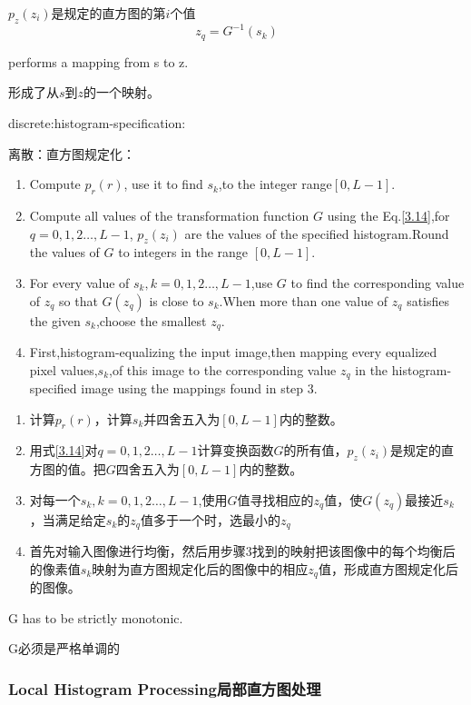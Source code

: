 \documentclass[12pt]{article}
\numberwithin{equation}{section}%
\begin{document}
$p_z(z_{i})$是规定的直方图的第$i$个值
\begin{equation} \label {3.16}
z_{q}=G^{-1}(s_{k})
\end{equation}

performs a mapping from s to z.

形成了从$s$到$z$的一个映射。

discrete:histogram-specification:

离散：直方图规定化：

\begin{enumerate}
\item Compute $p_{r}(r)$, use it to find $s_{k}$,to the integer range$[0,L-1]$.
\item Compute all values of the transformation function $G$ using the Eq.\ref{3.14},for $q=0,1,2\ldots,L-1$, $p_{z}(z_{i})$ are the values of the specified histogram.Round the values of $G$ to integers in the range   $[0,L-1]$.
\item For every value of $s_{k},k=0,1,2\ldots,L-1$,use $G$ to find the corresponding value of $z_{q}$ so that $G(z_{q})$ is close to $s_{k}$.When more than one value of $z_{q}$ satisfies the given $s_{k}$,choose  the smallest $z_{q}$.
\item First,histogram-equalizing the input image,then mapping every equalized pixel values,$s_{k}$,of this image to the corresponding value  $z_{q}$ in the histogram-specified image using the mappings found in step 3.
\end{enumerate}

\begin{enumerate}
\item 计算$p_{r}(r)$，计算$s_{k}$并四舍五入为$[0,L-1]$内的整数。
\item 用式\ref{3.14}对$q=0,1,2\ldots,L-1$计算变换函数$G$的所有值，$p_{z}(z_{i})$是规定的直方图的值。把$G$四舍五入为$[0,L-1]$内的整数。
\item 对每一个$s_{k},k=0,1,2\ldots,L-1$,使用$G$值寻找相应的$z_{q}$值，使$G(z_{q})$最接近$s_{k}$，当满足给定$s_{k}$的$z_{q}$值多于一个时，选最小的$z_{q}$
\item 首先对输入图像进行均衡，然后用步骤3找到的映射把该图像中的每个均衡后的像素值$s_{k}$映射为直方图规定化后的图像中的相应$z_{q}$值，形成直方图规定化后的图像。
\end{enumerate}

G has to be strictly monotonic.

G必须是严格单调的

\subsubsection{Local Histogram Processing局部直方图处理}
\end{document}
